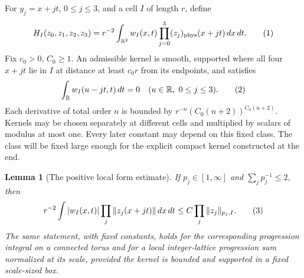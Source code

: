 \documentclass[11pt]{article}
\newtheorem{lemma}[theorem]{Lemma}
\theoremstyle{definition}
\newcommand{\R}{\mathbb R}
\newcommand{\phys}{\mathrm{phys}}
\newcommand{\eqtag}[1]{\refstepcounter{equation}\tag{\theequation}\label{#1}}
\numberwithin{equation}{section}
\begin{document}
For $y_j=x+jt$, $0\le j\le3$, and a cell $I$ of length $r$, define
\[
 H_I(z_0,z_1,z_2,z_3)=r^{-2}\int_{\R^2}w_I(x,t)\prod_{j=0}^3(z_j)_{\phys}(x+jt)\,dx\,dt.
 \eqtag{eq:local}
\]
Fix $c_0>0$, $C_0\ge1$. An admissible kernel is smooth, supported where all four $x+jt$ lie in $I$ at distance at least $c_0r$ from its endpoints, and satisfies
\[
 \int_\R w_I(u-jt,t)\,dt=0\quad(u\in\R,\ 0\le j\le3).
 \eqtag{eq:marginals}
\]
Each derivative of total order $n$ is bounded by $r^{-n}(C_0(n+2))^{C_0(n+2)}$. Kernels may be chosen separately at different cells and multiplied by scalars of modulus at most one. Every later constant may depend on this fixed class. The class will be fixed large enough for the explicit compact kernel constructed at the end.

\begin{lemma}[The positive local form estimate]\label{lem:absolute}
If $p_j\in[1,\infty]$ and $\sum_jp_j^{-1}\le2$, then
\[
 r^{-2}\int|w_I(x,t)|\prod_j\|z_j(x+jt)\|\,dx\,dt
 \le C\prod_j\|z_j\|_{p_j,I}.
 \eqtag{eq:absolute}
\]
The same statement, with fixed constants, holds for the corresponding progression integral on a connected torus and for a local integer-lattice progression sum normalized at its scale, provided the kernel is bounded and supported in a fixed scale-sized box.
\end{lemma}
\end{document}

